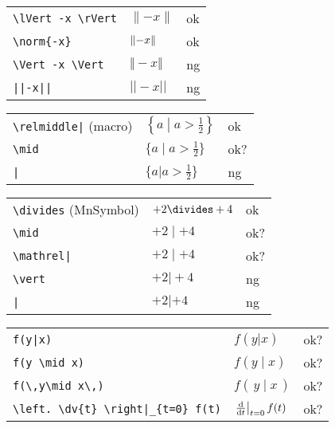 \documentclass[a4paper]{article}
\newcommand{\tA}[1]{\textcolor{cA}{#1}}
\newcommand{\tC}[1]{\textcolor{cC}{#1}}
\newcommand{\tD}[1]{\textcolor{cD}{#1}}
\begin{document}

\begin{table}[H]
	\centering
	\begin{tabular}{lll}
		\verb#\lVert -x \rVert# & $\lVert -x \rVert$ & \tA{ok} \\
		\verb#\norm{-x}#        & $\norm{-x}$        & \tA{ok} \\
		\verb#\Vert -x \Vert#   & $\Vert -x \Vert$   & \tD{ng} \\
		\verb#||-x||#           & $||-x||$           & \tD{ng} \\
	\end{tabular}
\end{table}

\begin{table}[H]
	\centering
	\begin{tabular}{lll}
		\verb#\relmiddle|# (macro) & $\displaystyle{\left\{ a \mathrel{}\middle|\mathrel{} a>\frac{1}{2} \right\}}$ & \tA{ok}  \\
		\verb#\mid#                & $\displaystyle{\{ a \mid a>\frac{1}{2} \}}$                                    & \tC{ok?} \\
		\verb#|#                   & $\displaystyle{\{ a | a>\frac{1}{2} \}}$                                       & \tD{ng}
	\end{tabular}
\end{table}

\begin{table}[H]
	\centering
	\begin{tabular}{lll}
		\verb#\divides# (MnSymbol) & $+2 \divides +4$  & \tA{ok}  \\
		\verb#\mid#                & $+2 \mid +4$      & \tC{ok?} \\
		\verb#\mathrel|#           & $+2 \mathrel| +4$ & \tC{ok?} \\
		\verb#\vert#               & $+2 \vert +4$     & \tD{ng}  \\
		\verb#|#                   & $+2 | +4$         & \tD{ng}  \\
	\end{tabular}
\end{table}

\begin{table}[H]
	\centering
	\begin{tabular}{lll}
		\verb#f(y|x)#                           & $f(y|x)$                           & \tC{ok?} \\
		\verb#f(y \mid x)#                      & $f(y \mid x)$                      & \tC{ok?} \\
		\verb#f(\,y\mid x\,)#                   & $f(\,y\mid x\,)$                   & \tC{ok?} \\
		\verb#\left. \dv{t} \right|_{t=0} f(t)# & $\left. \dv{t} \right|_{t=0} f(t)$ & \tC{ok?} \\
	\end{tabular}
\end{table}

\end{document}
